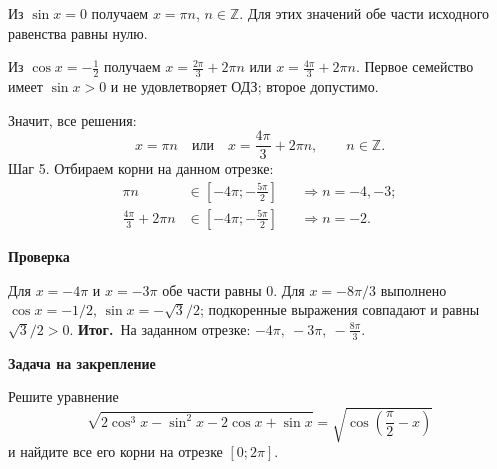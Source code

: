 \documentclass[a4paper,12pt]{article}
\newcommand{\result}{\textcolor{accent}{\textbf{Итог.}}\ }
\newcommand{\field}[1]{\par\smallskip\textbf{#1}\par\vspace{-3mm}}
\begin{document}
Из $\sin x=0$ получаем $x=\pi n$, $n\in\mathbb Z$. Для этих значений обе части исходного равенства равны нулю.

Из $\cos x=-\frac12$ получаем $x=\frac{2\pi}{3}+2\pi n$ или $x=\frac{4\pi}{3}+2\pi n$. Первое семейство имеет $\sin x>0$ и не удовлетворяет ОДЗ; второе допустимо.

Значит, все решения:
\[x=\pi n\quad\text{или}\quad x=\frac{4\pi}{3}+2\pi n,\qquad n\in\mathbb Z.\]
Шаг 5. Отбираем корни на данном отрезке:
\begin{align*}
\pi n &\in\left[-4\pi;-\frac{5\pi}{2}\right]
&&\Longrightarrow n=-4,-3;\\
\frac{4\pi}{3}+2\pi n &\in\left[-4\pi;-\frac{5\pi}{2}\right]
&&\Longrightarrow n=-2.
\end{align*}
\field{Проверка}
Для $x=-4\pi$ и $x=-3\pi$ обе части равны $0$. Для $x=-8\pi/3$ выполнено $\cos x=-1/2$, $\sin x=-\sqrt3/2$; подкоренные выражения совпадают и равны $\sqrt3/2>0$.
\result На заданном отрезке: $\boxed{-4\pi,\ -3\pi,\ -\frac{8\pi}{3}}$.
\field{Задача на закрепление}
Решите уравнение
\[\sqrt{2\cos^3x-\sin^2x-2\cos x+\sin x}
=\sqrt{\cos\left(\frac\pi2-x\right)}\]
и найдите все его корни на отрезке $[0;2\pi]$.
\end{document}
